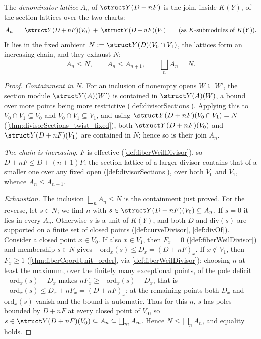 \begin{definition}
  \label{def:fiberLattice}
  \leanok
  The \emph{denominator lattice} \(A_n\) of \(\struct Y(D + nF)\) is the join, inside \(K(Y)\), of the
  section lattices over the two charts:
  \[
    A_n \;=\; \struct Y(D + nF)(V_0) \;+\; \struct Y(D + nF)(V_1)
    \qquad (\text{as } K\text{-submodules of } K(Y)).
  \]
  It lies in the fixed ambient \(N := \struct Y(D)(V_0 \cap V_1)\), the lattices form an increasing
  chain, and they exhaust \(N\):
  \[
    A_n \le N, \qquad A_n \le A_{n+1}, \qquad \bigsqcup_{n} A_n = N .
  \]
\end{definition}
\begin{proof}
  \leanok
  \emph{Containment in \(N\).} For an inclusion of nonempty opens \(W \subseteq W'\), the section
  module \(\struct Y(A)(W')\) is contained in \(\struct Y(A)(W)\), a bound over more points being more
  restrictive (\ref{def:divisorSections}). Applying this to \(V_0 \cap V_1 \subseteq V_0\) and \(V_0
  \cap V_1 \subseteq V_1\), and using \(\struct Y(D + nF)(V_0 \cap V_1) = N\)
  (\ref{thm:divisorSections_twist_fixed}), both \(\struct Y(D + nF)(V_0)\) and \(\struct Y(D +
  nF)(V_1)\) are contained in \(N\); hence so is their join \(A_n\).

  \emph{The chain is increasing.} \(F\) is effective (\ref{def:fiberWeilDivisor}), so \(D + nF \le D +
  (n+1)F\); the section lattice of a larger divisor contains that of a smaller one over any fixed open
  (\ref{def:divisorSections}), over both \(V_0\) and \(V_1\), whence \(A_n \le A_{n+1}\).

  \emph{Exhaustion.} The inclusion \(\bigsqcup_n A_n \le N\) is the containment just proved. For the
  reverse, let \(s \in N\); we find \(n\) with \(s \in \struct Y(D + nF)(V_0) \subseteq A_n\). If
  \(s = 0\) it lies in every \(A_n\). Otherwise \(s\) is a unit of \(K(Y)\), and both \(D\) and
  \(\mathrm{div}(s)\) are supported on a finite set of closed points (\ref{def:curveDivisor},
  \ref{def:divOf}). Consider a closed point \(x \in V_0\). If also \(x \in V_1\), then \(F_x = 0\)
  (\ref{def:fiberWeilDivisor}) and membership \(s \in N\) gives \(-\mathrm{ord}_x(s) \le D_x = (D +
  nF)_x\). If \(x \notin V_1\), then \(F_x \ge 1\) (\ref{thm:fiberCoordUnit_order}, via
  \ref{def:fiberWeilDivisor}); choosing \(n\) at least the maximum, over the finitely many exceptional
  points, of the pole deficit \(-\mathrm{ord}_x(s) - D_x\) makes \(n F_x \ge -\mathrm{ord}_x(s) -
  D_x\), that is \(-\mathrm{ord}_x(s) \le D_x + n F_x = (D + nF)_x\); at the remaining points both
  \(D_x\) and \(\mathrm{ord}_x(s)\) vanish and the bound is automatic. Thus for this \(n\), \(s\) has
  poles bounded by \(D + nF\) at every closed point of \(V_0\), so \(s \in \struct Y(D + nF)(V_0)
  \subseteq A_n \subseteq \bigsqcup_m A_m\). Hence \(N \le \bigsqcup_n A_n\), and equality holds.
\end{proof}

